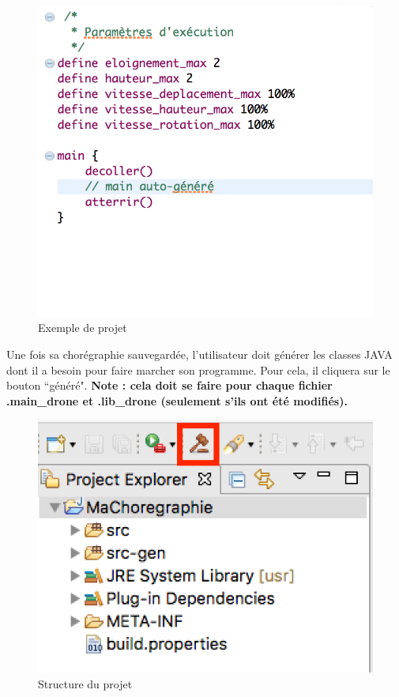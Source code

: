 \documentclass[12pt]{article}
\begin{document}
        \begin{figure}[!h]
        \centering
        \includegraphics[scale=0.60]{07.png}
        \caption{Exemple de projet}
        \end{figure}
        
        \newpage
        Une fois sa chorégraphie sauvegardée, l'utilisateur doit générer les classes JAVA dont il a besoin pour faire marcher son programme. Pour cela, il cliquera sur le bouton “généré". \textbf{Note : cela doit se faire pour chaque fichier .main\_drone et .lib\_drone (seulement s'ils ont été modifiés). }       
        \begin{figure}[!h]
        \centering
        \includegraphics[scale=0.80]{09.png}
        \caption{Structure du projet}
        \end{figure}
        
\end{document}
